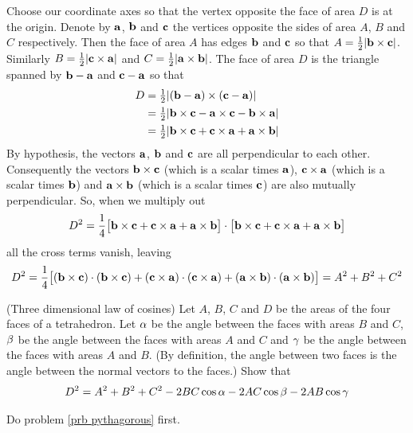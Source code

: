 \begin{solution}
Choose our coordinate axes so that the vertex opposite
the face of area $D$ is at the origin. Denote  by $\mathbf{a}$, $\mathbf{b}$ and
$\mathbf{c}$ the vertices opposite the sides of area $A$, $B$ and $C$ respectively.
Then the face of area $A$ has edges $\mathbf{b}$ and $\mathbf{c}$ so that
$A=\tfrac{1}{2} |\mathbf{b}\times\mathbf{c}|$. Similarly $B=\tfrac{1}{2}|\mathbf{c}\times\mathbf{a}|$ and
$C=\tfrac{1}{2}|\mathbf{a}\times \mathbf{b}|$. The face of area $D$ is the triangle 
spanned by $\mathbf{b}-\mathbf{a}$ and $\mathbf{c}-\mathbf{a}$ so that
\begin{align*}
D&=\tfrac{1}{2}|(\mathbf{b}-\mathbf{a})\times(\mathbf{c}-\mathbf{a})|\cr
&=\tfrac{1}{2}|\mathbf{b}\times \mathbf{c}-\mathbf{a}\times\mathbf{c}-\mathbf{b}\times\mathbf{a}|\\
&=\tfrac{1}{2}|\mathbf{b}\times \mathbf{c}+\mathbf{c}\times\mathbf{a}+\mathbf{a}\times\mathbf{b}|
\end{align*} 
By hypothesis, the vectors $\mathbf{a}$, $\mathbf{b}$ and $\mathbf{c}$ are all perpendicular
to each other. Consequently the vectors $\mathbf{b}\times \mathbf{c}$ (which is
a scalar times $\mathbf{a}$), $\mathbf{c}\times\mathbf{a}$ (which is a scalar times
$\mathbf{b}$) and $\mathbf{a}\times\mathbf{b}$ (which is a scalar times $\mathbf{c}$)
are also mutually perpendicular. So, when we multiply out
\begin{equation*}
D^2=\frac{1}{4}\big[\mathbf{b}\times \mathbf{c}+\mathbf{c}\times\mathbf{a}+\mathbf{a}\times\mathbf{b}\big]\cdot\big[\mathbf{b}\times \mathbf{c}+\mathbf{c}\times\mathbf{a}+\mathbf{a}\times\mathbf{b}\big]
\end{equation*}
all the cross terms vanish, leaving
\begin{equation*}
D^2=\frac{1}{4}\big[(\mathbf{b}\times \mathbf{c})\cdot(\mathbf{b}\times \mathbf{c})
+(\mathbf{c}\times\mathbf{a})\cdot(\mathbf{c}\times\mathbf{a})
+(\mathbf{a}\times\mathbf{b})\cdot(\mathbf{a}\times\mathbf{b})\big]=A^2+B^2+C^2
\end{equation*}
\end{solution}

\begin{question}
(Three dimensional law of cosines)  Let $A$, $B$, $C$ and
$D$ be the areas of the four faces of a tetrahedron. Let 
$\alpha$ be the angle between the faces with areas $B$ and $C$, 
$\beta$ be the angle between the faces with areas $A$ and $C$ and 
$\gamma$ be the angle between the faces with areas $A$ and $B$. 
(By definition, the angle between two faces is the angle between the normal vectors to the faces.)
 Show that 
\begin{equation*}
D^2=A^2+B^2+C^2-2BC\cos\alpha-2AC\cos\beta-2AB\cos\gamma
\end{equation*}
\end{question}

\begin{hint}
  Do problem \ref{prb pythagorous} first.
\end{hint}

